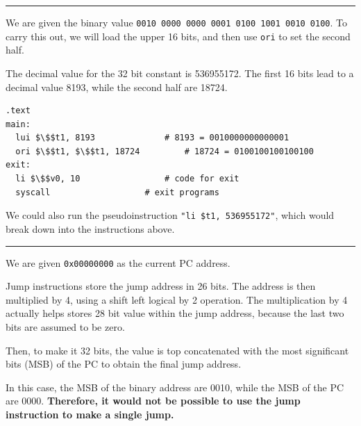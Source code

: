 \documentclass[11pt]{exam}
\newcommand{\cc}[1]{\texttt{#1}}
\newcounter{questionCounter}
\newcounter{partCounter}[questionCounter]
\newenvironment{namedquestion}[1]{%
    \addtocounter{questionCounter}{1}%
    \setcounter{partCounter}{0}%
    \vspace{.2in}%
        \noindent{\bf #1}%
    \vspace{0.3em} \hrule \vspace{.1in}%
}{}
\begin{document}
\begin{namedquestion}{Question 2.39}

We are given the binary value \cc{0010 0000 0000 0001 0100 1001 0010 0100}. To carry this out, we will load the upper 16 bits, and then use \cc{ori} to set the second half.

The decimal value for the 32 bit constant is 536955172. The first 16 bits lead to a decimal value 8193, while the second half are 18724. 

\begin{lstlisting}
.text
main: 
  lui $\$$t1, 8193              # 8193 = 0010000000000001
  ori $\$$t1, $\$$t1, 18724         # 18724 = 0100100100100100
exit:
  li $\$$v0, 10                 # code for exit
  syscall                   # exit programs  
\end{lstlisting}

We could also run the pseudoinstruction \cc{"li \$t1, 536955172"}, which would break down into the instructions above.
\end{namedquestion}

\begin{namedquestion}{Question 2.40}

We are given \cc{0x00000000} as the current PC address.

Jump instructions store the jump address in 26 bits. The address is then multiplied by 4, using a shift left logical by 2 operation. The multiplication by 4 actually helps stores 28 bit value within the jump address, because the last two bits are assumed to be zero.

Then, to make it 32 bits, the value is top concatenated with the most significant bits (MSB) of the PC to obtain the final jump address. 

In this case, the MSB of the binary address are 0010, while the MSB of the PC are 0000. \textbf{Therefore, it would not be possible to use the jump instruction to make a single jump.}
\end{namedquestion}
\end{document}
